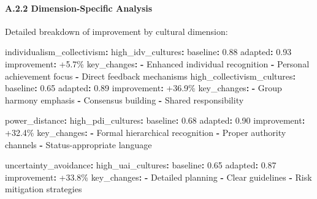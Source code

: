 \documentclass[
]{article}
\newenvironment{Shaded}{}{}
\newcommand{\AttributeTok}[1]{\textcolor[rgb]{0.49,0.56,0.16}{#1}}
\newcommand{\FloatTok}[1]{\textcolor[rgb]{0.25,0.63,0.44}{#1}}
\newcommand{\FunctionTok}[1]{\textcolor[rgb]{0.02,0.16,0.49}{#1}}
\newcommand{\KeywordTok}[1]{\textcolor[rgb]{0.00,0.44,0.13}{\textbf{#1}}}
\begin{document}
\paragraph{A.2.2 Dimension-Specific
Analysis}\label{a.2.2-dimension-specific-analysis}

Detailed breakdown of improvement by cultural dimension:

\begin{Shaded}
\begin{Highlighting}[]
\FunctionTok{individualism\_collectivism}\KeywordTok{:}
\AttributeTok{  }\FunctionTok{high\_idv\_cultures}\KeywordTok{:}
\AttributeTok{    }\FunctionTok{baseline}\KeywordTok{:}\AttributeTok{ }\FloatTok{0.88}
\AttributeTok{    }\FunctionTok{adapted}\KeywordTok{:}\AttributeTok{ }\FloatTok{0.93}
\AttributeTok{    }\FunctionTok{improvement}\KeywordTok{:}\AttributeTok{ +5.7\%}
\AttributeTok{    }\FunctionTok{key\_changes}\KeywordTok{:}
\AttributeTok{      }\KeywordTok{{-}}\AttributeTok{ Enhanced individual recognition}
\AttributeTok{      }\KeywordTok{{-}}\AttributeTok{ Personal achievement focus}
\AttributeTok{      }\KeywordTok{{-}}\AttributeTok{ Direct feedback mechanisms}
\AttributeTok{  }
\AttributeTok{  }\FunctionTok{high\_collectivism\_cultures}\KeywordTok{:}
\AttributeTok{    }\FunctionTok{baseline}\KeywordTok{:}\AttributeTok{ }\FloatTok{0.65}
\AttributeTok{    }\FunctionTok{adapted}\KeywordTok{:}\AttributeTok{ }\FloatTok{0.89}
\AttributeTok{    }\FunctionTok{improvement}\KeywordTok{:}\AttributeTok{ +36.9\%}
\AttributeTok{    }\FunctionTok{key\_changes}\KeywordTok{:}
\AttributeTok{      }\KeywordTok{{-}}\AttributeTok{ Group harmony emphasis}
\AttributeTok{      }\KeywordTok{{-}}\AttributeTok{ Consensus building}
\AttributeTok{      }\KeywordTok{{-}}\AttributeTok{ Shared responsibility}

\FunctionTok{power\_distance}\KeywordTok{:}
\AttributeTok{  }\FunctionTok{high\_pdi\_cultures}\KeywordTok{:}
\AttributeTok{    }\FunctionTok{baseline}\KeywordTok{:}\AttributeTok{ }\FloatTok{0.68}
\AttributeTok{    }\FunctionTok{adapted}\KeywordTok{:}\AttributeTok{ }\FloatTok{0.90}
\AttributeTok{    }\FunctionTok{improvement}\KeywordTok{:}\AttributeTok{ +32.4\%}
\AttributeTok{    }\FunctionTok{key\_changes}\KeywordTok{:}
\AttributeTok{      }\KeywordTok{{-}}\AttributeTok{ Formal hierarchical recognition}
\AttributeTok{      }\KeywordTok{{-}}\AttributeTok{ Proper authority channels}
\AttributeTok{      }\KeywordTok{{-}}\AttributeTok{ Status{-}appropriate language}

\FunctionTok{uncertainty\_avoidance}\KeywordTok{:}
\AttributeTok{  }\FunctionTok{high\_uai\_cultures}\KeywordTok{:}
\AttributeTok{    }\FunctionTok{baseline}\KeywordTok{:}\AttributeTok{ }\FloatTok{0.65}
\AttributeTok{    }\FunctionTok{adapted}\KeywordTok{:}\AttributeTok{ }\FloatTok{0.87}
\AttributeTok{    }\FunctionTok{improvement}\KeywordTok{:}\AttributeTok{ +33.8\%}
\AttributeTok{    }\FunctionTok{key\_changes}\KeywordTok{:}
\AttributeTok{      }\KeywordTok{{-}}\AttributeTok{ Detailed planning}
\AttributeTok{      }\KeywordTok{{-}}\AttributeTok{ Clear guidelines}
\AttributeTok{      }\KeywordTok{{-}}\AttributeTok{ Risk mitigation strategies}
\end{Highlighting}
\end{Shaded}
\end{document}
